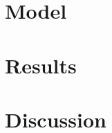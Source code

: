 \documentclass[11pt,titlepage,a4paper]{article}
\begin{document}
    \section{Model}\label{section_model}
    
    \newpage
    
    \section{Results}\label{section_results}
    
    \newpage
    
    \section{Discussion}\label{section_discussion}
    
    \newpage
    
    \printbibliography
    \newpage
    
    \appendix
    
\end{document}
